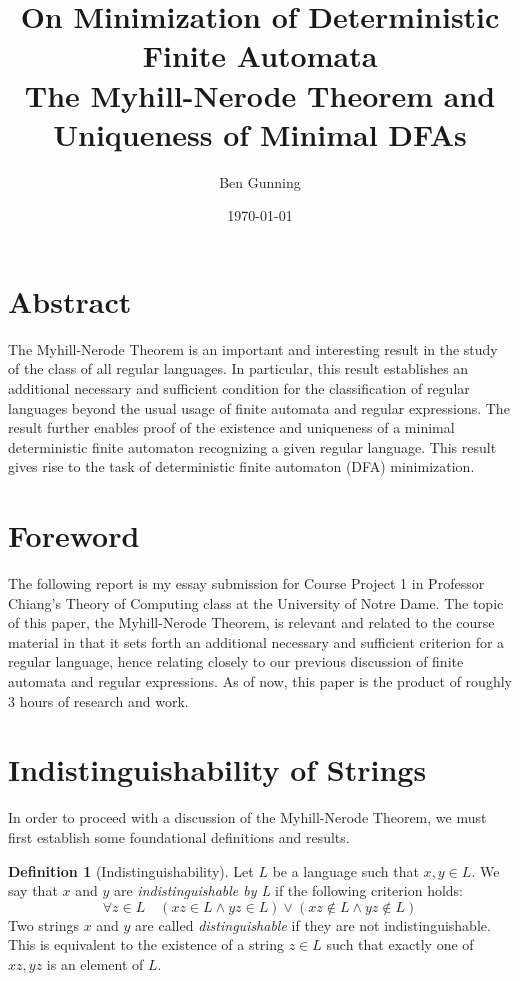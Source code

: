 \documentclass[12pt]{article}
\title{\textbf{\Large{On Minimization of Deterministic Finite Automata}} \\ \large{\textbf{The Myhill-Nerode Theorem and Uniqueness of Minimal DFAs}}}
\author{Ben Gunning}
\date{\today}
\theoremstyle{definition}
\newtheorem{definition}[theorem]{Definition}
\theoremstyle{remark}
\begin{document}
\maketitle



\section*{Abstract}
The Myhill-Nerode Theorem is an important and interesting result in the study of the class of all regular languages. In particular, this result establishes an additional necessary and sufficient condition for the classification of regular languages beyond the usual usage of finite automata and regular expressions.
The result further enables proof of the existence and uniqueness of a minimal deterministic finite automaton recognizing a given regular language. This result gives rise to the task of deterministic finite automaton (DFA) minimization.

\section*{Foreword}
The following report is my essay submission for Course Project 1 in Professor Chiang's Theory of Computing class at the University of Notre Dame. The topic of this paper, the Myhill-Nerode Theorem, is relevant and related to the course material in that it sets forth an additional necessary and sufficient
criterion for a regular language, hence relating closely to our previous discussion of finite automata and regular expressions. As of now, this paper is the product of roughly 3 hours of research and work.

\section{Indistinguishability of Strings}

In order to proceed with a discussion of the Myhill-Nerode Theorem, we must first establish some foundational definitions and results.

\begin{definition}[Indistinguishability]
Let $L$ be a language such that $x,y \in L$. We say that $x$ and $y$ are \emph{indistinguishable by L} if the following criterion holds:
\[ \forall z \in L \quad (xz \in L \wedge yz \in L) \vee (xz \notin L \wedge yz \notin L) \]
Two strings $x$ and $y$ are called \emph{distinguishable} if they are not indistinguishable. This is equivalent to the existence of a string $z \in L$ such that exactly one of $xz,yz$ is an element of $L$.
\end{definition}
\end{document}
